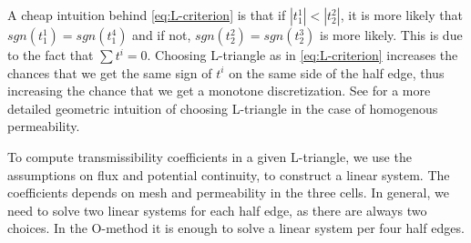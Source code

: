 \documentclass[../Main/main.tex]{subfiles}
\begin{document}
	A cheap intuition behind \eqref{eq:L-criterion} is that if $|t_1^1|<|t_2^2|$, it is more likely that $sgn(t_1^1) = sgn(t_1^4)$ and if not, $sgn(t_2^2) = sgn(t_2^3)$ is more likely. This is due to the fact that $\sum t^i = 0$. Choosing L-triangle as in \eqref{eq:L-criterion} increases the chances that we get the same sign of $t^i$ on the same side of the half edge, thus increasing the chance that we get a monotone discretization.  See \cite{https://doi.org/10.1002/fld.1926} for a more detailed geometric intuition of choosing L-triangle in the case of homogenous permeability. 
	\par 
	To compute transmissibility coefficients in a given L-triangle, we use the assumptions on flux and potential continuity, to construct a linear system. The coefficients depends on mesh and permeability in the three cells. In general, we need to solve two linear systems for each half edge, as there are always two choices. In the O-method it is enough to solve a linear system per four half edges.
	
\end{document}
